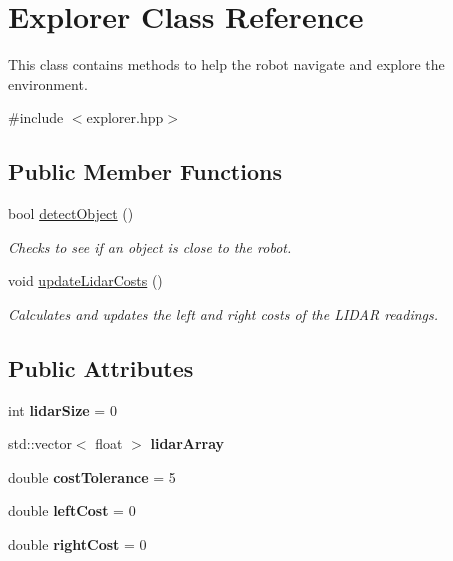 \hypertarget{classExplorer}{}\section{Explorer Class Reference}
\label{classExplorer}


This class contains methods to help the robot navigate and explore the environment.  




{\ttfamily \#include $<$explorer.\+hpp$>$}

\subsection*{Public Member Functions}
\begin{DoxyCompactItemize}
\item 
bool \hyperlink{classExplorer_a78d779c3481f8efdac866b8d7f5065db}{detect\+Object} ()
\begin{DoxyCompactList}\small\item\em Checks to see if an object is close to the robot. \end{DoxyCompactList}\item 
\mbox{\label{classExplorer_a22c40f735fe750a4e31d31b043e76d57}} 
void \hyperlink{classExplorer_a22c40f735fe750a4e31d31b043e76d57}{update\+Lidar\+Costs} ()
\begin{DoxyCompactList}\small\item\em Calculates and updates the left and right costs of the L\+I\+D\+AR readings. \end{DoxyCompactList}\end{DoxyCompactItemize}
\subsection*{Public Attributes}
\begin{DoxyCompactItemize}
\item 
\mbox{\label{classExplorer_acc1dfe135405abb0dfbf8815b1e54176}} 
int {\bfseries lidar\+Size} = 0
\item 
\mbox{\label{classExplorer_a4c6d55edb8100d0078995a58ba52665e}} 
std\+::vector$<$ float $>$ {\bfseries lidar\+Array}
\item 
\mbox{\label{classExplorer_aab17793b6fdb8219483829f98a86b899}} 
double {\bfseries cost\+Tolerance} = 5
\item 
\mbox{\label{classExplorer_a75e969d800f9f880ef7738f24b21ed84}} 
double {\bfseries left\+Cost} = 0
\item 
\mbox{\label{classExplorer_a173d158afbaf753a6736403577dda99b}} 
double {\bfseries right\+Cost} = 0
\end{DoxyCompactItemize}


